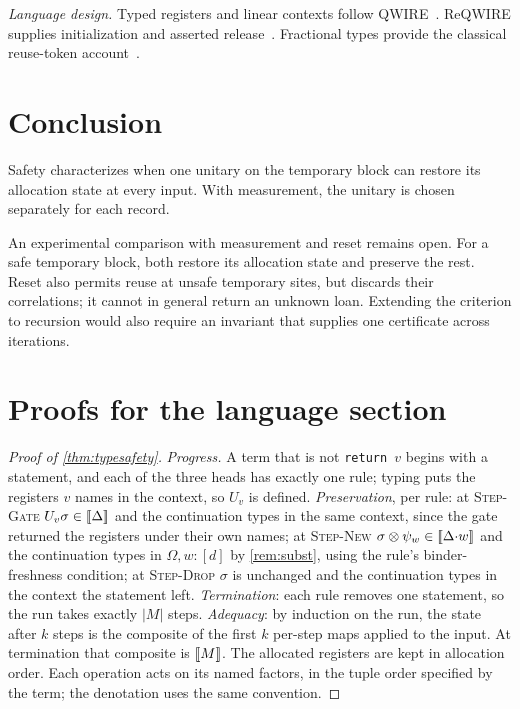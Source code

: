 \documentclass[acmsmall,screen,review,anonymous,nonacm]{acmart}
\begin{document}
\emph{Language design.} Typed registers and linear contexts follow
\textsc{QWIRE}~\cite{Paykin2017QWIRE}. ReQWIRE supplies initialization and
asserted release~\cite{Rand2019ReQWIRE}. Fractional types provide the classical
reuse-token account~\cite{Chen2020Fractional}.

\section{Conclusion}\label{sec:conclusion}

Safety characterizes when one unitary on the temporary block can
restore its allocation state at every input. With measurement, the
unitary is chosen separately for each record.

An experimental comparison with measurement and reset remains open.
For a safe temporary block, both restore its allocation state and preserve
the rest. Reset also permits reuse at unsafe temporary sites, but discards
their correlations; it cannot in general return an unknown loan. Extending
the criterion to recursion would also require an invariant that supplies
one certificate across iterations.




\appendix

\section{Proofs for the language section}\label{app:language}

\begin{proof}[Proof of \cref{thm:typesafety}]
\emph{Progress.} A term that is not \texttt{return }$v$ begins with a statement, and
each of the three heads has exactly one rule; typing puts the registers $v$ names in
the context, so $U_v$ is defined. \emph{Preservation}, per rule: at \textsc{Step-Gate}
$U_v\sigma \in [\![\Delta]\!]$ and the continuation types in the same context, since the
gate returned the registers under their own names; at \textsc{Step-New}
$\sigma \otimes \psi_w \in [\![\Delta{\cdot}w]\!]$ and the continuation types in
$\Omega, w{:}[d]$ by \cref{rem:subst}, using the rule's binder-freshness condition; at
\textsc{Step-Drop} $\sigma$ is unchanged and the continuation types in the context the
statement left. \emph{Termination}: each rule removes one statement, so the run
takes exactly $|M|$ steps. \emph{Adequacy}: by
induction on the run, the state after $k$ steps is the composite of the
first $k$ per-step maps applied to the input. At termination that composite
is $[\![M]\!]$. The allocated registers are kept in allocation order. Each operation
acts on its named factors, in the tuple order specified by the term;
the denotation uses the same convention.
\end{proof}
\end{document}

